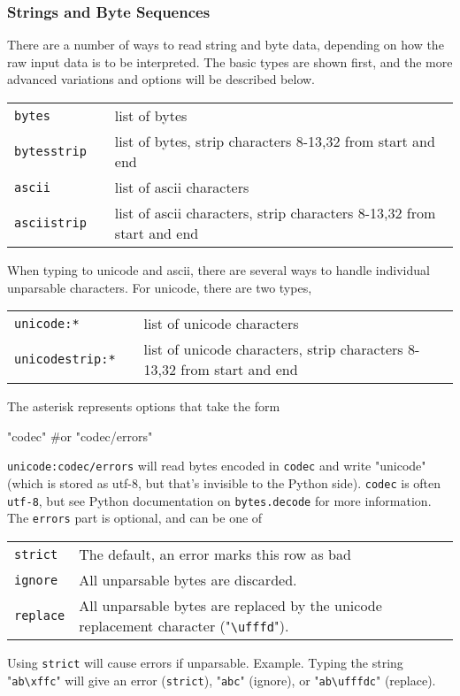 \subsubsection{Strings and Byte Sequences}
There are a number of ways to read string and byte data, depending on
how the raw input data is to be interpreted.  The basic types are
shown first, and the more advanced variations and options will be
described below.
\begin{leftbar}
\begin{tabular}{p{2cm}p{2cm}p{8cm}}
  \texttt{bytes}      && list of bytes\\
  \texttt{bytesstrip} && list of bytes, strip characters 8-13,32 from start and end\\
  \texttt{ascii}      && list of ascii characters\\
  \texttt{asciistrip} && list of ascii characters, strip characters 8-13,32 from start and end\\
\end{tabular}
\end{leftbar}

When typing to unicode and ascii, there are several ways to handle
individual unparsable characters.  For unicode, there are two types,
\begin{leftbar}
\begin{tabular}{p{2cm}p{2cm}p{8cm}}
  \texttt{unicode:*}  && list of unicode characters\\
  \texttt{unicodestrip:*} && list of unicode characters, strip
  characters 8-13,32 from start and end\\
\end{tabular}
\end{leftbar}
The asterisk represents options that take the form
\begin{python}
"codec" #or
"codec/errors"
\end{python}
\texttt{unicode:codec/errors} will read bytes encoded in
\texttt{codec} and write "unicode" (which is stored as utf-8, but
that's invisible to the Python side).  \texttt{codec} is often
\texttt{utf-8}, but see Python documentation on \texttt{bytes.decode}
for more information.  The \texttt{errors} part is optional, and can
be one of
\begin{snugshade}
\begin{tabular}{p{2cm}p{10cm}}
  \texttt{strict} &The default, an error marks this row as bad\\[1ex]
  \texttt{ignore} & All unparsable bytes are discarded.\\[1ex]
  \texttt{replace} & All unparsable bytes are replaced by the unicode
  replacement character ("\texttt{\textbackslash ufffd}").\\[1ex]
\end{tabular}
\end{snugshade}
\noindent Using \texttt{strict} will cause errors if unparsable.
Example.  Typing the string "\texttt{ab\textbackslash xffc}" will give
an error (\texttt{strict}), "\texttt{abc}" (ignore), or
"\texttt{ab\textbackslash ufffdc}" (replace).



